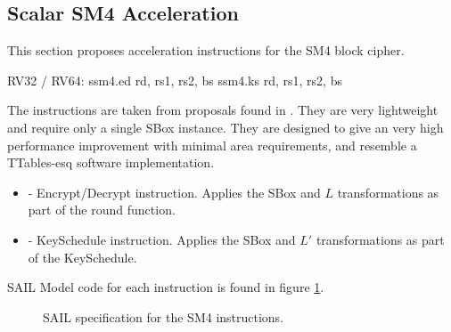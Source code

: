 
\newpage
\subsection{Scalar SM4 Acceleration}
\label{sec:scalar:sm4}

This section proposes acceleration instructions for
the SM4 block cipher\cite{block:sm4:1, ietf:sm4}.

\begin{cryptoisa}
RV32 / RV64:
    ssm4.ed     rd, rs1, rs2, bs
    ssm4.ks     rd, rs1, rs2, bs
\end{cryptoisa}

The instructions are taken from proposals found in \cite{MJS:LWAES:20}.
They are very lightweight and require only a single SBox instance.
They are designed to give an very high performance improvement with
minimal area requirements, and resemble a TTables-esq
software implementation.

\begin{itemize}
\item {} - Encrypt/Decrypt instruction. Applies the
    SBox and $L$ transformations as part of the round function.
\item {} - KeySchedule instruction. Applies the
    SBox and $L'$ transformations as part of the KeySchedule.
\end{itemize}

SAIL Model code for each instruction is found in figure
\ref{fig:sail:sm4}.

%
%
%


\begin{figure}[h]

\caption{SAIL specification for the SM4 instructions.}
\label{fig:sail:sm4}
\end{figure}
